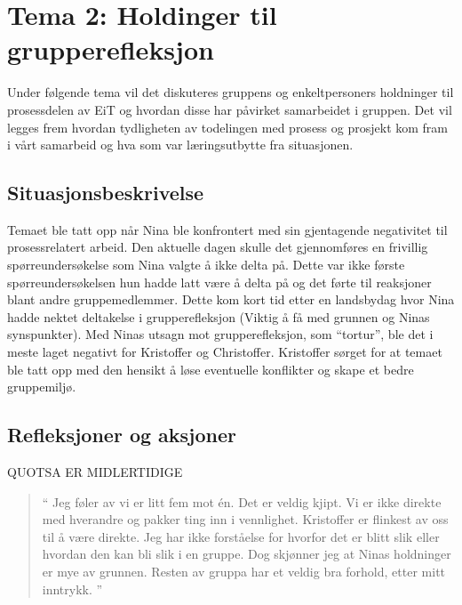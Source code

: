 \chapter{Tema 2: Holdinger til grupperefleksjon}

Under følgende tema vil det diskuteres gruppens og enkeltpersoners holdninger til prosessdelen av EiT og hvordan
disse har påvirket samarbeidet i gruppen. Det vil legges frem hvordan tydligheten av todelingen med prosess og 
prosjekt kom fram i vårt samarbeid og hva som var læringsutbytte fra situasjonen. 

\section{Situasjonsbeskrivelse}

Temaet ble tatt opp når Nina ble konfrontert med sin gjentagende negativitet til prosessrelatert arbeid. Den aktuelle 
dagen skulle det gjennomføres en frivillig spørreundersøkelse som Nina valgte å ikke delta på. Dette var ikke første 
spørreundersøkelsen hun hadde latt være å delta på og det førte til reaksjoner blant andre gruppemedlemmer. Dette 
kom kort tid etter en landsbydag hvor Nina hadde nektet deltakelse i grupperefleksjon (Viktig å få med grunnen og 
Ninas synspunkter). Med Ninas utsagn mot grupperefleksjon, som ``tortur'', ble det i meste laget
negativt for Kristoffer og Christoffer. Kristoffer sørget for at temaet ble tatt opp med den hensikt å løse eventuelle
konflikter og skape et bedre gruppemiljø.

\section{Refleksjoner og aksjoner}

QUOTSA ER MIDLERTIDIGE

\begin{quote}``
Jeg føler av vi er litt fem mot én. Det er veldig kjipt.
Vi er ikke direkte med hverandre og pakker ting inn i vennlighet. Kristoffer er flinkest av oss til å være direkte.
Jeg har ikke forståelse for hvorfor det er blitt slik eller hvordan den kan bli slik i en gruppe. Dog skjønner jeg at 
Ninas holdninger er mye av grunnen. Resten av gruppa har et veldig bra forhold, etter mitt inntrykk.
''\end{quote} 

